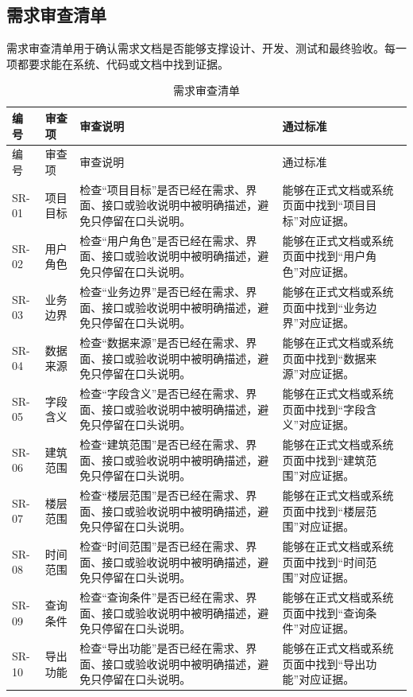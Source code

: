 \documentclass[12pt,a4paper]{ctexart}
\begin{document}
\subsection{需求审查清单}
需求审查清单用于确认需求文档是否能够支撑设计、开发、测试和最终验收。每一项都要求能在系统、代码或文档中找到证据。
\begin{longtable}{L{1.7cm}L{3.0cm}L{6.2cm}L{4.4cm}}
\caption{需求审查清单}\\
\toprule
编号 & 审查项 & 审查说明 & 通过标准 \\
\midrule
\endfirsthead
\toprule
编号 & 审查项 & 审查说明 & 通过标准 \\
\midrule
\endhead
SR-01 & 项目目标 & 检查“项目目标”是否已经在需求、界面、接口或验收说明中被明确描述，避免只停留在口头说明。 & 能够在正式文档或系统页面中找到“项目目标”对应证据。 \\
SR-02 & 用户角色 & 检查“用户角色”是否已经在需求、界面、接口或验收说明中被明确描述，避免只停留在口头说明。 & 能够在正式文档或系统页面中找到“用户角色”对应证据。 \\
SR-03 & 业务边界 & 检查“业务边界”是否已经在需求、界面、接口或验收说明中被明确描述，避免只停留在口头说明。 & 能够在正式文档或系统页面中找到“业务边界”对应证据。 \\
SR-04 & 数据来源 & 检查“数据来源”是否已经在需求、界面、接口或验收说明中被明确描述，避免只停留在口头说明。 & 能够在正式文档或系统页面中找到“数据来源”对应证据。 \\
SR-05 & 字段含义 & 检查“字段含义”是否已经在需求、界面、接口或验收说明中被明确描述，避免只停留在口头说明。 & 能够在正式文档或系统页面中找到“字段含义”对应证据。 \\
SR-06 & 建筑范围 & 检查“建筑范围”是否已经在需求、界面、接口或验收说明中被明确描述，避免只停留在口头说明。 & 能够在正式文档或系统页面中找到“建筑范围”对应证据。 \\
SR-07 & 楼层范围 & 检查“楼层范围”是否已经在需求、界面、接口或验收说明中被明确描述，避免只停留在口头说明。 & 能够在正式文档或系统页面中找到“楼层范围”对应证据。 \\
SR-08 & 时间范围 & 检查“时间范围”是否已经在需求、界面、接口或验收说明中被明确描述，避免只停留在口头说明。 & 能够在正式文档或系统页面中找到“时间范围”对应证据。 \\
SR-09 & 查询条件 & 检查“查询条件”是否已经在需求、界面、接口或验收说明中被明确描述，避免只停留在口头说明。 & 能够在正式文档或系统页面中找到“查询条件”对应证据。 \\
SR-10 & 导出功能 & 检查“导出功能”是否已经在需求、界面、接口或验收说明中被明确描述，避免只停留在口头说明。 & 能够在正式文档或系统页面中找到“导出功能”对应证据。 \\

\end{longtable}
\end{document}
